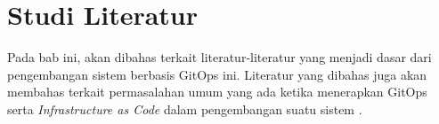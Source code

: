\chapter{Studi Literatur}

Pada bab ini, akan dibahas terkait literatur-literatur yang menjadi dasar dari pengembangan sistem berbasis GitOps ini. Literatur yang dibahas juga akan membahas terkait permasalahan umum yang ada ketika menerapkan GitOps serta \textit{Infrastructure as Code} dalam pengembangan suatu sistem \cite{knuth2001art}.


